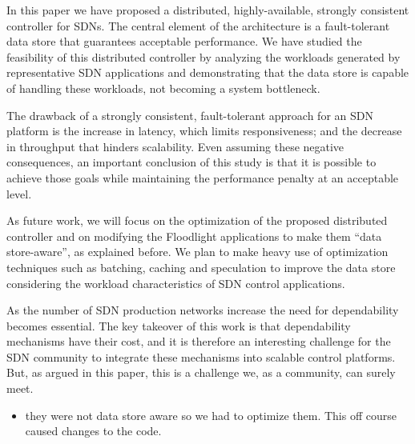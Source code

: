 In this paper we have proposed a distributed, highly-available, strongly consistent controller for SDNs.
The central element of the architecture is a fault-tolerant data store that guarantees acceptable performance.
We have studied the feasibility of this distributed controller by analyzing  the workloads generated by representative SDN applications and demonstrating that the data store is capable of handling these workloads, not becoming a system bottleneck.

The drawback of a strongly consistent, fault-tolerant approach for an SDN platform is the increase in latency, which limits responsiveness; and the decrease in throughput that hinders scalability.
Even assuming these negative consequences, an important conclusion of this study is that it is possible to achieve those goals while maintaining the performance penalty at an acceptable level.

As future work, we will focus on the optimization of the proposed distributed controller and on modifying the Floodlight applications to make them ``data store-aware'', as explained before. 
We plan to make heavy use of optimization techniques such as batching, caching and speculation to improve the data store considering the workload characteristics of SDN control applications.

As the number of SDN production networks increase the need for dependability becomes essential. The key takeover of this work is that dependability mechanisms have their cost, and it is therefore an interesting challenge for the SDN community to integrate these mechanisms into scalable control platforms. But, as argued in this paper, this is a challenge we, as a community, can surely meet.\\


\begin{itemize}
\item they were not data store aware so we had to optimize them. This off course caused changes to the code.
\end{itemize}





